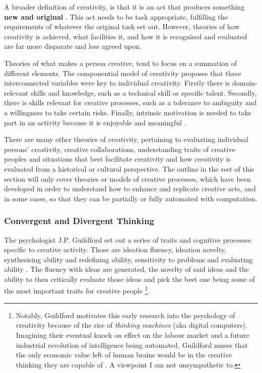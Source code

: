 A broader definition of creativity, is that it is an act that produces something \textbf{new and original} \citep{kaufman2021overview}. This act needs to be task appropriate, fulfilling the requirements of whatever the original task set out. 
However, theories of how creativity is achieved, what facilities it, and how it is recognised and evaluated are far more disparate and less agreed upon. 

Theories of what makes a person creative, tend to focus on a summation of different elements. 
The componential model of creativity proposes that three interconnected variables were key to individual creativity.
Firstly there is domain-relevant skills and knowledge, such as a technical skill or specific talent.
Secondly, there is skills relevant for creative processes, such as a tolerance to ambiguity and a willingness to take certain risks.
Finally, intrinsic motivation is needed to take part in an activity because it is enjoyable and meaningful \citep{amabile1983social}.

There are many other theories of creativity, pertaining to evaluating individual persons' creativity, creative collaborations, understanding traits of creative peoples and situations that best facilitate creativity and how creativity is evaluated from a historical or cultural perspective. 
The outline in the rest of this section will only cover theories or models of creative processes, which have been developed in order to understand how to enhance and replicate creative acts, and in some cases, so that they can be partially or fully automated with computation.

\subsubsection{Convergent and Divergent Thinking}

The psychologist J.P. Guildford set out a series of traits and cognitive processes specific to creative activity. Those are ideation fluency, ideation novelty, synthesising ability and redefining ability, sensitivity to problems and evaluating ability \citep{guilford1950creativity}. The fluency with ideas are generated, the novelty of said ideas and the ability to then critically evaluate those ideas and pick the best one being some of the most important traits for creative people
\footnote{Notably, Guildford motivates this early research into the psychology of creativity because of the rise of \textit{thinking machines} (aka digital computers).
Imagining their eventual knock on effect on the labour market and a future industrial revolution of intelligence being automated, Guildford muses that the only economic value left of human brains would be in the creative thinking they are capable of \citep{guilford1950creativity}. 
A viewpoint I am not unsympathetic to.}. 

